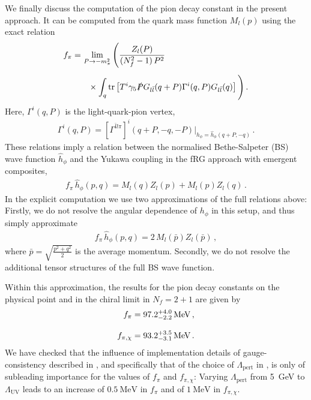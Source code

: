 \documentclass[aps,twocolumn,prd,superscriptaddress]{revtex4-2}
\begin{document}
We finally discuss the computation of the pion decay constant in the present approach. It can be computed from the quark mass function $M_l(p)$ using the exact relation
%
\begin{align}\label{eq:fpi}
	f_\pi =&\, \lim\limits_{P\to -m_\pi^2} \Bigg( \frac{Z_l(P)}{(N_f^2 - 1)\,P^2} 
	\notag\\[1ex]
	&\hspace{.3cm}\times\int_q \textrm{tr}\left[
	T^i \gamma_5 \slashed P G_{l\bar l}(q+P) \Gamma^i(q,P) G_{l\bar l}(q)
	\right]\Bigg)\,.
\end{align}
%
Here, $\Gamma^i(q,P)$ is the light-quark-pion vertex, 
%
\begin{align}
	\Gamma^i(q,P) = [\Gamma^{\bar ll\pi}]^i(q+P,-q,-P)\Big\vert_{h_\phi = \hat h_\phi(q+P,-q)}\,. 
\end{align}
%
These relations imply a relation between the normalised Bethe-Salpeter (BS) wave function $\hat h_\phi$ and the Yukawa coupling in the fRG approach with emergent composites, 
%
\begin{align}
	f_\pi\, \hat h_\phi(p,q) = M_l(q)Z_l(p) + M_l(p)Z_l(q)\,.
\end{align}
%
In the explicit computation we use two approximations of the full relations above: Firstly, we do not resolve the angular dependence of $h_\phi$ in this setup, and thus simply approximate
%
\begin{align}
	f_\pi \, \hat h_\phi(p,q) = 2\,M_l(\bar p)Z_l(\bar p)\,,
\end{align}
%
where $\bar p = \sqrt{\frac{p^2 + q^2}{2}}$ is the average momentum.
Secondly, we do not resolve the additional tensor structures of the full BS wave function.

Within this approximation, the results for the pion decay constants on the physical point and in the chiral limit in $N_f=2+1$ are given by
%
\begin{align}
		f_\pi &= 97.2^{+4.0}_{-2.2}\,\unit{\MeV}\,,
		\notag \\[2ex]
		f_{\pi,\chi} &= 93.2^{+3.5}_{-3.1}\,\unit{\MeV}\,.
\label{eq:fpiresults}
\end{align}
%
We have checked that the influence of implementation details of gauge-consistency described in , and specifically that of the choice of $\Lambda_\textrm{pert}$ in , is only of subleading importance for the values of $f_{\pi}$ and $f_{\pi,\chi}$: Varying $\Lambda_\textrm{pert}$ from \qty{5}{GeV} to $\Lambda_\textrm{UV}$ leads to an increase of $\qty{0.5}{\MeV}$ in $f_\pi$ and of $\qty{1}{\MeV}$ in $f_{\pi,\chi}$. 
\end{document}
